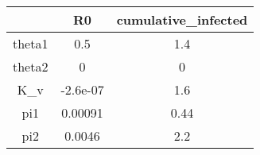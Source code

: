 \begin{tabular}{|c|c|c|}
\hline
& R0 & cumulative_infected \\
\hline
theta1 & 0.5 & 1.4 \\
\hline
theta2 & 0 & 0 \\
\hline
K_v & -2.6e-07 & 1.6 \\
\hline
pi1 & 0.00091 & 0.44 \\
\hline
pi2 & 0.0046 & 2.2 \\
\hline
\end{tabular}
